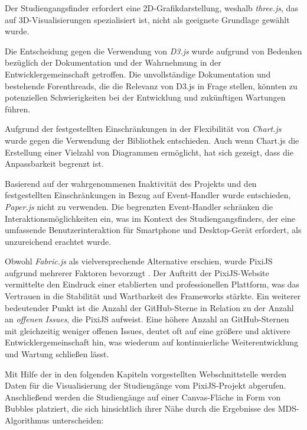 
Der Studiengangsfinder erfordert eine 2D-Grafikdarstellung, weshalb
\textit{three.js}, das auf 3D-Visualisierungen spezialisiert ist, nicht als
geeignete Grundlage gewählt wurde. \parencite{threejs_threejs_2023}

Die Entscheidung gegen die Verwendung von \textit{D3.js} wurde aufgrund
von Bedenken bezüglich der Dokumentation und der Wahrnehmung in der 
Entwicklergemeinschaft getroffen. Die unvollständige Dokumentation und
bestehende Forenthreads, die die Relevanz von D3.js in Frage stellen, könnten zu
potenziellen Schwierigkeiten bei der Entwicklung und zukünftigen Wartungen
führen. \parencite{bostock_d3js_2023}


Aufgrund der festgestellten Einschränkungen in der Flexibilität von \textit{Chart.js} wurde gegen die Verwendung der Bibliothek entschieden. Auch wenn Chart.js die Erstellung einer Vielzahl von Diagrammen ermöglicht, hat sich gezeigt, dass die Anpassbarkeit begrenzt ist. \parencite{etimberg_chartjs_2023}

Basierend auf der wahrgenommenen Inaktivität des Projekts und den festgestellten 
Einschränkungen in Bezug auf Event-Handler wurde entschieden, \textit{Paper.js}
nicht zu verwenden. \parencite{lehni_paperjs_2023} Die begrenzten Event-Handler schränken
die Interaktionsmöglichkeiten ein, was im Kontext des Studiengangsfinders, der
eine umfassende Benutzerinteraktion für Smartphone und Desktop-Gerät erfordert,
als unzureichend erachtet wurde. \parencite{etimberg_paperjs_2023}

Obwohl \textit{Fabric.js} als vielversprechende Alternative erschien, wurde PixiJS aufgrund mehrerer Faktoren bevorzugt \parencite{zaytsev_fabricjs_2023}. Der Auftritt der PixiJS-Website vermittelte den Eindruck einer etablierten und professionellen Plattform, was das Vertrauen in die Stabilität und Wartbarkeit des Frameworks stärkte. Ein weiterer bedeutender Punkt ist die Anzahl der GitHub-Sterne in Relation zu der Anzahl an \textit{offenen Issues}, die PixiJS aufweist. Eine höhere Anzahl an GitHub-Sternen mit gleichzeitig weniger offenen Issues, deutet oft auf eine größere und aktivere Entwicklergemeinschaft hin, was wiederum auf kontinuierliche Weiterentwicklung und Wartung schließen lässt. \parencite{batista_github_2023}

Mit Hilfe der in den folgenden Kapiteln vorgestellten Webschnittstelle werden Daten für die Visualisierung der Studiengänge vom PixiJS-Projekt abgerufen. Anschließend werden die Studiengänge auf einer Canvas-Fläche in Form von Bubbles platziert, die sich hinsichtlich ihrer Nähe durch die Ergebnisse des MDS-Algorithmus unterscheiden:

